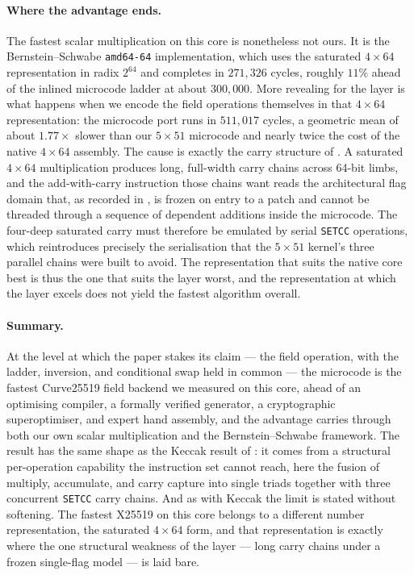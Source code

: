 \paragraph{Where the advantage ends.}
The fastest scalar multiplication on this core is nonetheless not ours. It is the
Bernstein--Schwabe \texttt{amd64-64} implementation, which uses the saturated
$4\times64$ representation in radix $2^{64}$ and completes in $271{,}326$ cycles,
roughly $11\%$ ahead of the inlined microcode ladder at about $300{,}000$. More
revealing for the layer is what happens when we encode the field operations
themselves in that $4\times64$ representation: the microcode port runs in
$511{,}017$ cycles, a geometric mean of about $1.77\times$ slower than our
$5\times51$ microcode and nearly twice the cost of the native $4\times64$ assembly.
The cause is exactly the carry structure of . A saturated
$4\times64$ multiplication produces long, full-width carry chains across 64-bit
limbs, and the add-with-carry instruction those chains want reads the architectural
flag domain that, as recorded in , is frozen on entry to a
patch and cannot be threaded through a sequence of dependent additions inside the
microcode. The four-deep saturated carry must therefore be emulated by serial
\texttt{SETCC} operations, which reintroduces precisely the serialisation that the
$5\times51$ kernel's three parallel chains were built to avoid. The representation
that suits the native core best is thus the one that suits the layer worst, and the
representation at which the layer excels does not yield the fastest algorithm
overall.

\paragraph{Summary.}
At the level at which the paper stakes its claim --- the field operation, with the
ladder, inversion, and conditional swap held in common --- the microcode is the
fastest Curve25519 field backend we measured on this core, ahead of an optimising
compiler, a formally verified generator, a cryptographic superoptimiser, and expert
hand assembly, and the advantage carries through both our own scalar multiplication
and the Bernstein--Schwabe framework. The result has the same shape as the Keccak
result of : it comes from a structural per-operation capability
the instruction set cannot reach, here the fusion of multiply, accumulate, and
carry capture into single triads together with three concurrent \texttt{SETCC}
carry chains. And as with Keccak the limit is stated without softening. The fastest
X25519 on this core belongs to a different number representation, the saturated
$4\times64$ form, and that representation is exactly where the one structural
weakness of the layer --- long carry chains under a frozen single-flag model ---
is laid bare.
